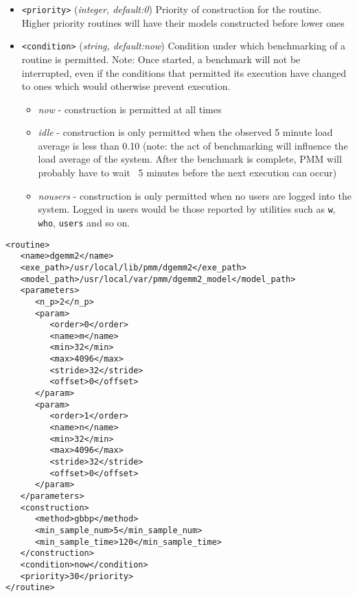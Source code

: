 \documentclass[a4paper,12pt]{report}
\begin{document}
    \begin{itemize}
        \item \verb+<priority>+ (\emph{integer, default:0}) Priority of
            construction for the routine. Higher priority routines will have
            their models constructed before lower ones
        \item \verb+<condition>+ (\emph{string, default:now}) Condition under
            which benchmarking of a routine is permitted. Note: Once started, a
            benchmark will not be interrupted, even if the conditions that
            permitted its execution have changed to ones which would otherwise
            prevent execution.
            \begin{itemize}
                \item \emph{now} - construction is permitted at all times
                \item \emph{idle} - construction is only permitted when the
                    observed 5 minute load average is less than 0.10 (note: the
                    act of benchmarking will influence the load average of the
                    system. After the benchmark is complete, PMM will probably
                    have to wait ~5 minutes before the next execution can
                    occur)
                \item \emph{nousers} - construction is only permitted when no
                    users are logged into the system. Logged in users would be
                    those reported by utilities such as \verb+w+, \verb+who+,
                    \verb+users+ and so on.
            \end{itemize}
    \end{itemize}


    \begin{lstlisting}[style=xmlconfig,caption=Routine Configuration Example,label=routine_config_example]
<routine>
   <name>dgemm2</name>
   <exe_path>/usr/local/lib/pmm/dgemm2</exe_path>
   <model_path>/usr/local/var/pmm/dgemm2_model</model_path>
   <parameters>
      <n_p>2</n_p>
      <param>
         <order>0</order>
         <name>m</name>
         <min>32</min>
         <max>4096</max>
         <stride>32</stride>
         <offset>0</offset>
      </param>
      <param>
         <order>1</order>
         <name>n</name>
         <min>32</min>
         <max>4096</max>
         <stride>32</stride>
         <offset>0</offset>
      </param>
   </parameters>
   <construction>
      <method>gbbp</method>
      <min_sample_num>5</min_sample_num>
      <min_sample_time>120</min_sample_time>
   </construction>
   <condition>now</condition>
   <priority>30</priority>
</routine>
    \end{lstlisting}
\end{document}
